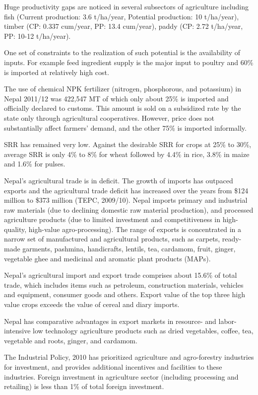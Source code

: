 \documentclass[
  openany]{book}
\begin{document}
Huge productivity gaps are noticed in several subsectors of agriculture including fish (Current production: 3.6 t/ha/year, Potential production: 10 t/ha/year), timber (CP: 0.337 cum/year, PP: 13.4 cum/year), paddy (CP: 2.72 t/ha/year, PP: 10-12 t/ha/year).

One set of constraints to the realization of such potential is the availability of inputs. For example feed ingredient supply is the major input to poultry and 60\% is imported at relatively high cost.

The use of chemical NPK fertilizer (nitrogen, phosphorous, and potassium) in Nepal 2011/12 was 422,547 MT of which only about 25\% is imported and officially declared to customs. This amount is sold on a subsidized rate by the state only through agricultural cooperatives. However, price does not substantially affect farmers' demand, and the other 75\% is imported informally.

SRR has remained very low. Against the desirable SRR for crops at 25\% to 30\%, average SRR is only 4\% to 8\% for wheat followed by 4.4\% in rice, 3.8\% in maize and 1.6\% for pulses.

Nepal's agricultural trade is in deficit. The growth of imports has outpaced exports and the agricultural trade deficit has increased over the years from \$124 million to \$373 million (TEPC, 2009/10). Nepal imports primary and industrial raw materials (due to declining domestic raw material production), and processed agriculture products (due to limited investment and competitiveness in high-quality, high-value agro-processing). The range of exports is concentrated in a narrow set of manufactured and agricultural products, such as carpets, ready-made garments, pashmina, handicrafts, lentils, tea, cardamom, fruit, ginger, vegetable ghee and medicinal and aromatic plant products (MAPs).

Nepal's agricultural import and export trade comprises about 15.6\% of total trade, which includes items such as petroleum, construction materials, vehicles and equipment, consumer goods and others. Export value of the top three high value crops exceeds the value of cereal and diary imports.

Nepal has comparative advantages in export markets in resource- and labor-intensive low technology agriculture products such as dried vegetables, coffee, tea, vegetable and roots, ginger, and cardamom.

The Industrial Policy, 2010 has prioritized agriculture and agro-forestry industries for investment, and provides additional incentives and facilities to these industries. Foreign investment in agriculture sector (including processing and retailing) is less than 1\% of total foreign investment.
\end{document}
